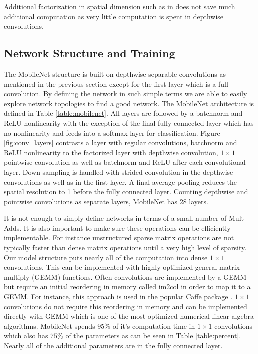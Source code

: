 \documentclass[10pt,twocolumn,letterpaper]{article}
\begin{document}
Additional factorization in spatial dimension such as in \cite{jin2014flattened,szegedy2015rethinking} does not save much additional computation as very little computation is spent in depthwise convolutions.

\subsection{Network Structure and Training}

The MobileNet structure is built on depthwise separable convolutions as mentioned in the previous section except for the first layer which is a full convolution. By defining the network in such simple terms we are able to easily explore network topologies to find a good network. The MobileNet architecture is defined in Table \ref{table:mobilenet}. All layers are followed by a batchnorm \cite{ioffe2015batch} and ReLU nonlinearity with the exception of the final fully connected layer which has no nonlinearity and feeds into a softmax layer for classification. Figure \ref{fig:conv_layers} contrasts a layer with regular convolutions, batchnorm and ReLU nonlinearity to the factorized layer with depthwise convolution, $1 \times 1$ pointwise convolution as well as batchnorm and ReLU after each convolutional layer. Down sampling is handled with strided convolution in the depthwise convolutions as well as in the first layer. A final average pooling reduces the spatial resolution to 1 before the fully connected layer. Counting depthwise and pointwise convolutions as separate layers, MobileNet has 28 layers.

It is not enough to simply define networks in terms of a small number of Mult-Adds. It is also important to make sure these operations can be efficiently implementable. For instance unstructured sparse matrix operations are not typically faster than dense matrix operations until a very high level of sparsity. Our model structure puts nearly all of the computation into dense $1 \times 1$ convolutions. This can be implemented with highly optimized general matrix multiply (GEMM) functions. Often convolutions are implemented by a GEMM but require an initial reordering in memory called im2col in order to map it to a GEMM. For instance, this approach is used in the popular Caffe package \cite{jia2014caffe}. $1 \times 1$ convolutions do not require this reordering in memory and can be implemented directly with GEMM which is one of the most optimized numerical linear algebra algorithms. MobileNet spends $95\%$ of it's computation time in $1 \times 1$ convolutions which also has $75\%$ of the parameters as can be seen in Table \ref{table:percent}. Nearly all of the additional parameters are in the fully connected layer.
\end{document}
